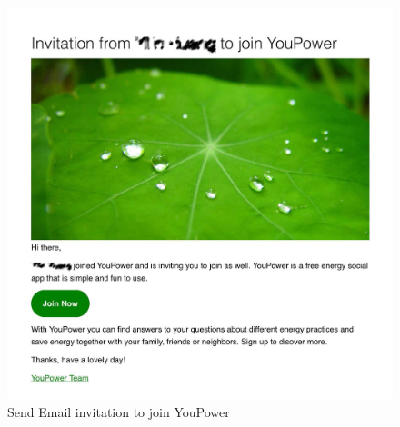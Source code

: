 \documentclass[a4paper]{article}
\begin{document}
\begin{figure}[h!]
\begin{center}
\begin{minipage}[t!]{0.6\linewidth}
         \includegraphics[width=1\linewidth]{img/invite2.jpg}    
        \end{minipage}
      \end{center}\caption{Send Email invitation to join YouPower }\label{fig:invite}
\end{figure}
\end{document}
